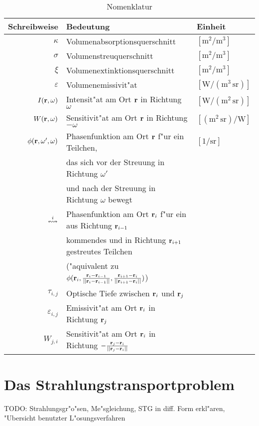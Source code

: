 \documentclass[11pt,a4paper,DIVcalc,BCOR8mm,titlepage,twoside]{scrartcl}
\begin{document}
	\begin{table}
		\caption{Nomenklatur}
		\begin{center}
		\begin{tabular}{rll}
			Schreibweise & Bedeutung & Einheit \\
			\hline
			$\kappa$ & Volumenabsorptionsquerschnitt & $\left[\text{m}^2/\text{m}^3\right]$ \\
			$\sigma$ & Volumenstreuquerschnitt & $\left[\text{m}^2/\text{m}^3\right]$ \\
			$\xi$ & Volumenextinktionsquerschnitt & $\left[\text{m}^2/\text{m}^3\right]$ \\
			$\varepsilon$ & Volumenemissivit"at & $\left[\text{W}/(\text{m}^3\,\text{sr})\right]$ \\
			$I(\mathbf{r},\omega)$ & Intensit"at am Ort $\mathbf{r}$ in Richtung $\omega$& $\left[\text{W}/(\text{m}^2\,\text{sr})\right]$ \\
			$W(\mathbf{r},\omega)$ & Sensitivit"at am Ort $\mathbf{r}$ in Richtung $-\omega$ & $\left[(\text{m}^2\,\text{sr})/\text{W}\right]$ \\
			$\phi(\mathbf{r},\omega',\omega)$ & Phasenfunktion am Ort $\mathbf{r}$ f"ur ein Teilchen, & $\left[1/\text{sr}\right]$ \\
				&das sich vor der Streuung in Richtung $\omega'$&\\
				&und nach der Streuung in Richtung $\omega$ bewegt& \\
			$\overset{i}{\leftrightsquigarrow}$ & Phasenfunktion am Ort $\mathbf{r}_i$ f"ur ein aus Richtung $\mathbf{r}_{i-1}$&\\ 
				&kommendes und in Richtung $\mathbf{r}_{i+1}$ gestreutes Teilchen&\\
				&("aquivalent zu $\phi(\mathbf{r}_i,\frac{\mathbf{r}_i-\mathbf{r}_{i-1}}{||\mathbf{r}_i-\mathbf{r}_{i-1}||},\frac{\mathbf{r}_{i+1}-\mathbf{r}_i}{||\mathbf{r}_{i+1}-\mathbf{r}_i||})$)& \\
			$\tau_{i,j}$ & Optische Tiefe zwischen $\mathbf{r}_i$ und $\mathbf{r}_j$ & \\
			$\varepsilon_{i,j}$ & Emissivit"at am Ort $\mathbf{r}_i$ in Richtung $\mathbf{r}_j$ & \\
			$W_{j,i}$ & Sensitivit"at am Ort $\mathbf{r}_i$ in Richtung $-\frac{\mathbf{r}_j-\mathbf{r}_i}{||\mathbf{r}_j-\mathbf{r}_i||}$ &
		\end{tabular}
		\end{center}
		\label{tab:nomenklatur}
	\end{table}
	
	
	\section{Das Strahlungstransportproblem}
	TODO: Strahlungsgr"o"sen, Me"sgleichung, STG in diff. Form erkl"aren, "Ubersicht benutzter L"osungsverfahren
	
\end{document}

